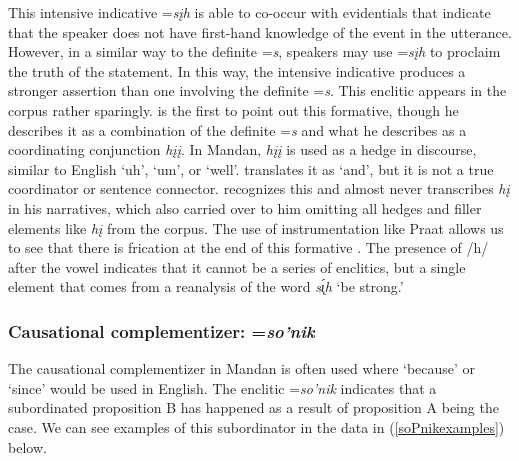 This intensive indicative =\textit{sįh} is able to co-occur with evidentials that indicate that the speaker does not have first-hand knowledge of the event in the utterance. However, in a similar way to the definite =\textit{s}, speakers may use =\textit{sįh} to proclaim the truth of the statement. In this way, the intensive indicative produces a stronger assertion than one involving the definite =\textit{s}. This enclitic appears in the corpus rather sparingly. \citet[28]{mixco1997a} is the first to point out this formative, though he describes it as a combination of the definite =\textit{s} and what he describes as a coordinating conjunction \textit{hįį}. In Mandan, \textit{hįį} is used as a hedge in discourse, similar to English `uh', `um', or `well'. \citeauthor{mixco1997a} translates it as `and', but it is not a true coordinator or sentence connector. \citet{hollow1973a,hollow1973b} recognizes this and almost never transcribes \textit{hį} in his narratives, which also carried over to him omitting all hedges and filler elements like \textit{hį} from the corpus. The use of instrumentation like Praat allows us to see that there is frication at the end of this formative \citep{boersmaweenik2016}. The presence of /h/ after the vowel indicates that it cannot be a series of enclitics, but a single element that comes from a reanalysis of the word \textit{s\'{ı̨}h} `be strong.'

\subsubsection{Causational complementizer: =\textit{so'nik}}

The causational complementizer in Mandan is often used where `because' or `since' would be used in English. The enclitic =\textit{so'nik} indicates that a subordinated proposition B has happened as a result of proposition A being the case. We can see examples of this subordinator in the data in (\ref{soPnikexamples}) below.

